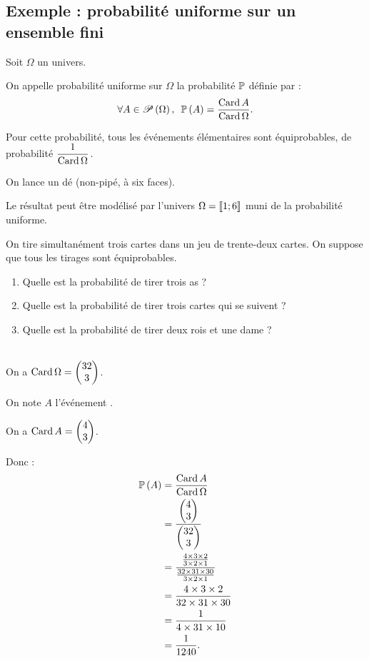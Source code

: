 \subsection{Exemple : probabilité uniforme sur un ensemble fini}

\begin{defi}
Soit \(\Omega\) un univers.

On appelle probabilité uniforme sur \(\Omega\) la probabilité \(\prem\) définie par : \[\quantifs{\forall A\in\P{\Omega}}\proba{A}=\dfrac{\Card A}{\Card\Omega}.\]

Pour cette probabilité, tous les événements élémentaires sont équiprobables, de probabilité \(\dfrac{1}{\Card\Omega}\).
\end{defi}

\begin{ex}[Lancer d'un dé]
On lance un dé (non-pipé, à six faces).

Le résultat peut être modélisé par l'univers \(\Omega=\interventierii{1}{6}\) muni de la probabilité uniforme.
\end{ex}

\begin{exoex}
On tire simultanément trois cartes dans un jeu de trente-deux cartes. On suppose que tous les tirages sont équiprobables.

\begin{enumerate}
    \item Quelle est la probabilité de tirer trois as ? \\
    \item Quelle est la probabilité de tirer trois cartes qui se suivent ? \\
    \item Quelle est la probabilité de tirer deux rois et une dame ?
\end{enumerate}
\end{exoex}

\begin{corr}[1]~\\
On a \(\Card\Omega=\binom{3}{32}\).

On note \(A\) l'événement .

On a \(\Card A=\binom{3}{4}\).

Donc : \[\begin{aligned}
\proba{A}&=\dfrac{\Card A}{\Card\Omega} \\
&=\dfrac{\binom{3}{4}}{\binom{3}{32}} \\
&=\dfrac{\frac{4\times3\times2}{3\times2\times1}}{\frac{32\times31\times30}{3\times2\times1}} \\
&=\dfrac{4\times3\times2}{32\times31\times30} \\
&=\dfrac{1}{4\times31\times10} \\
&=\dfrac{1}{1240}.
\end{aligned}\]
\end{corr}

